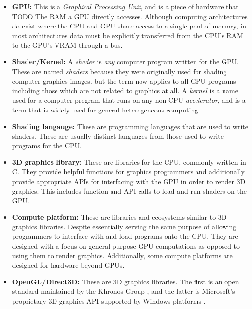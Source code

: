 \documentclass[a4paper,12pt,twoside,openright]{report}
\begin{document}
\begin{itemize}

    \item \textbf{GPU:} This is a \textit{Graphical Processing Unit}, and is a
    piece of hardware that TODO The RAM a GPU directly accesses. Although
    computing architectures do exist where the CPU and GPU share access to a
    single pool of memory, in most architectures data must be explicitly
    transferred from the CPU's RAM to the GPU's VRAM through a bus.

    \item \textbf{Shader/Kernel:} A \textit{shader} is \textit{any} computer
    program written for the GPU. These are named \textit{shaders} because they
    were originally used for shading computer graphics images, but the term now
    applies to all GPU programs including those which are not related to
    graphics at all. A \textit{kernel} is a name used for a computer program
    that runs on any non-CPU \textit{accelerator}, and is a term that is widely
    used for general heterogeneous computing.

    \item \textbf{Shading langauge:} These are programming languages that are
    used to write shaders. These are usually distinct languages from those used
    to write programs for the CPU.

    \item \textbf{3D graphics library:} These are libraries for the CPU,
    commonly written in C. They provide helpful functions for graphics
    programmers and additionally provide appropriate APIs for interfacing with
    the GPU in order to render 3D graphics. This includes function and API
    calls to load and run shaders on the GPU.

    \item \textbf{Compute platform:} These are libraries and ecosystems similar
    to 3D graphics libraries. Despite essentially serving the same purpose of
    allowing programmers to interface with and load programs onto the GPU. They
    are designed with a focus on general purpose GPU computations as opposed to
    using them to render graphics. Additionally, some compute platforms are
    designed for hardware beyond GPUs.

    \item \textbf{OpenGL/Direct3D:} These are 3D graphics libraries. The first
    is an open standard maintained by the Khronos Group \cite{OpenGL}, and the
    latter is Microsoft's proprietary 3D graphics API supported by Windows
    platforms \cite{Direct3D}.


\end{itemize}
\end{document}
